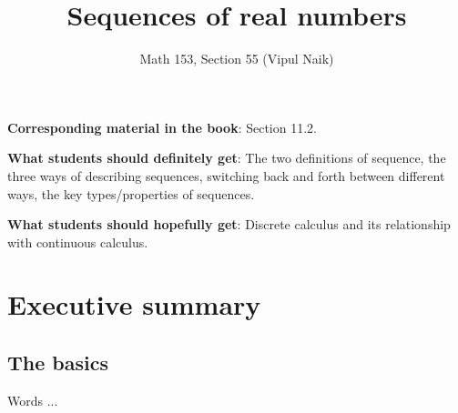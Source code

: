 \documentclass{amsart}
\title{Sequences of real numbers}
\author{Math 153, Section 55 (Vipul Naik)}
\begin{document}
\maketitle

{\bf Corresponding material in the book}: Section 11.2.

{\bf What students should definitely get}: The two definitions of
sequence, the three ways of describing sequences, switching back and
forth between different ways, the key types/properties of sequences.

{\bf What students should hopefully get}: Discrete calculus and its
relationship with continuous calculus.


\section*{Executive summary}

\subsection{The basics}

Words ...
\end{document}
